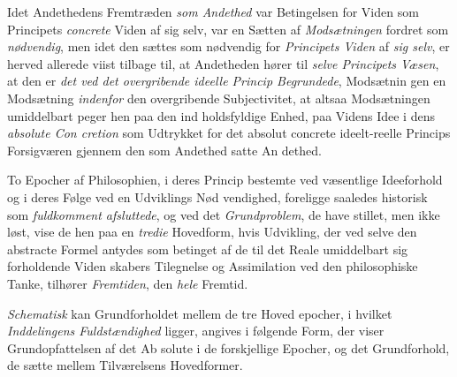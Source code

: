 Idet Andethedens Fremtræden \emph{som Andethed} var Betingelsen
for Viden som Principets \emph{concrete} Viden af sig selv, var en
Sætten af \emph{Modsætningen} fordret som \emph{nødvendig}, men
idet den sættes som nødvendig for \emph{Principets Viden} af
\emph{sig selv}, er herved allerede viist tilbage til, at Andetheden
hører til \emph{selve Principets Væsen}, at den er \emph{det ved det
overgribende ideelle Princip Begrundede}, Modsætnin\-%
gen en Modsætning \emph{indenfor} den overgribende Subjectivitet,
at altsaa Modsætningen umiddelbart peger hen paa den ind\-%
holdsfyldige Enhed, paa Videns Idee i dens \emph{absolute Con\-%
cretion} som Udtrykket for det absolut concrete ideelt-reelle
Princips Forsigværen gjennem den som Andethed satte An\-%
dethed.

To Epocher af Philosophien, i deres Princip bestemte ved
væsentlige Ideeforhold og i deres Følge ved en Udviklings Nød\-%
vendighed, foreligge saaledes historisk som \emph{fuldkomment
afsluttede}, og ved det \emph{Grundproblem}, de have stillet,
men ikke løst, vise de hen paa en \emph{tredie} Hovedform, hvis
Udvikling, der ved selve den abstracte Formel antydes som
betinget af de til det Reale umiddelbart sig forholdende Viden\-%
skabers Tilegnelse og Assimilation ved den philosophiske Tanke,
tilhører \emph{Fremtiden}, den \emph{hele} Fremtid.

\emph{Schematisk} kan Grundforholdet mellem de tre Hoved\-%
epocher, i hvilket \emph{Inddelingens Fuldstændighed} ligger,
angives i følgende Form, der viser Grundopfattelsen af det Ab\-%
solute i de forskjellige Epocher, og det Grundforhold, de sætte
mellem Tilværelsens Hovedformer.

